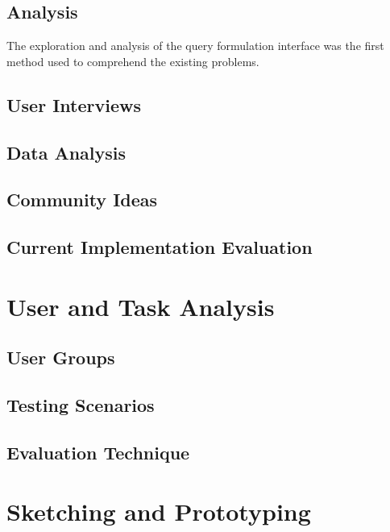 \subsection{Analysis}
\label{subsec:analysis}

The exploration and analysis of the query formulation interface was the first method used to comprehend the existing problems.

\subsection{User Interviews}
\label{subsec:user_interviews}

\subsection{Data Analysis}
\label{subsec:data_analysis}

\subsection{Community Ideas}
\label{subsec:community_ideas}

\subsection{Current Implementation Evaluation}
\label{sec:current_implementation_evaluation}


\section{User and Task Analysis}
\label{sec:user_and_task_analysis}

\subsection{User Groups}
\label{subsec:user_groups}

\subsection{Testing Scenarios}
\label{subsec:testing_scenarios}

\subsection{Evaluation Technique}
\label{subsec:evaluation_technique}

\section{Sketching and Prototyping}
\label{sec:sketching_and_prototyping}

